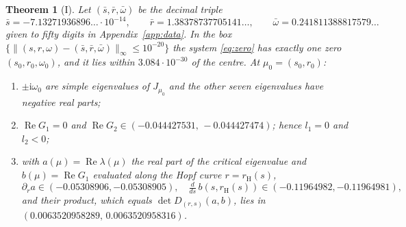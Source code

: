 \documentclass[11pt,a4paper]{article}
\theoremstyle{plain}
\newtheorem{theorem}{Theorem}[section]
\theoremstyle{definition}
\theoremstyle{remark}
\newcommand{\ii}{\mathrm i}
\newcommand{\norm}[1]{\lVert#1\rVert}
\DeclareMathOperator{\Ree}{Re}
\newcommand{\evI}{\textsf{I}}
\begin{document}
\begin{theorem}[\evI]\label{thm:GH}
Let $(\bar s,\bar r,\bar\omega)$ be the decimal triple
\[
\bar s=-7.13271936896\ldots\cdot10^{-14},\qquad \bar r=1.38378737705141\ldots,\qquad\bar\omega=0.241811388817579\ldots
\]
given to fifty digits in Appendix~\ref{app:data}. In the box $\{\norm{(s,r,\omega)-(\bar s,\bar r,\bar\omega)}_\infty\le10^{-20}\}$ the system \eqref{eq:zero} has exactly one zero $(s_0,r_0,\omega_0)$, and it lies within $3.084\cdot10^{-30}$ of the centre. At $\mu_0=(s_0,r_0)$:
\begin{enumerate}[label=\textup{(\alph*)},leftmargin=*]
\item $\pm\ii\omega_0$ are simple eigenvalues of $J_{\mu_0}$ and the other seven eigenvalues have negative real parts;
\item $\Ree G_1=0$ and $\Ree G_2\in(-0.044427531,\,-0.044427474)$; hence $l_1=0$ and $l_2<0$;
\item with $a(\mu)=\Ree\lambda(\mu)$ the real part of the critical eigenvalue and $b(\mu)=\Ree G_1$ evaluated along the Hopf curve $r=r_{\mathrm H}(s)$,
\[
\partial_ra\in(-0.05308906,-0.05308905),\quad \tfrac{d}{ds}\,b(s,r_{\mathrm H}(s))\in(-0.11964982,-0.11964981),
\]
and their product, which equals $\det D_{(r,s)}(a,b)$, lies in $(0.0063520958289,\,0.0063520958316)$.
\end{enumerate}
\end{theorem}
\end{document}
